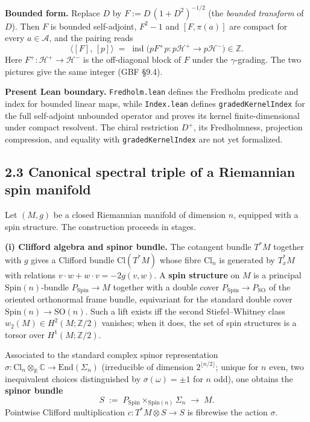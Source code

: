 \documentclass[
  11pt,
]{article}
\begin{document}
\textbf{Bounded form.} Replace \(D\) by \(F := D\,(1 + D^2)^{-1/2}\)
(the \emph{bounded transform} of \(D\)). Then \(F\) is bounded
self-adjoint, \(F^2 - 1\) and \([F, \pi(a)]\) are compact for every
\(a \in \mathcal{A}\), and the pairing reads \[
\bigl\langle [F],\,[p]\bigr\rangle
\;=\; \mathop{\mathrm{ind}}\bigl(p F^+ p\colon p\mathcal{H}^+ \to p\mathcal{H}^-\bigr) \in \mathbb{Z}.
\] Here \(F^+\colon \mathcal{H}^+ \to \mathcal{H}^-\) is the
off-diagonal block of \(F\) under the \(\gamma\)-grading. The two
pictures give the same integer (GBF §9.4).

\textbf{Present Lean boundary.} \texttt{Fredholm.lean} defines the
Fredholm predicate and index for bounded linear maps, while
\texttt{Index.lean} defines \texttt{gradedKernelIndex} for the full
self-adjoint unbounded operator and proves its kernel finite-dimensional
under compact resolvent. The chiral restriction \(D^+\), its Fredholmness,
projection compression, and equality with \texttt{gradedKernelIndex} are
not yet formalized.

\subsection{2.3 Canonical spectral triple of a Riemannian spin
manifold}\label{canonical-spectral-triple-of-a-riemannian-spin-manifold}

Let \((M, g)\) be a closed Riemannian manifold of dimension \(n\),
equipped with a spin structure. The construction proceeds in stages.

\textbf{(i) Clifford algebra and spinor bundle.} The cotangent bundle
\(T^*M\) together with \(g\) gives a Clifford bundle
\(\mathrm{Cl}(T^*M)\) whose fibre \(\mathrm{Cl}_n\) is generated by
\(T^*_x M\) with relations \(v \cdot w + w \cdot v = -2 g(v, w)\). A
\textbf{spin structure} on \(M\) is a principal
\(\mathrm{Spin}(n)\)-bundle \(P_{\mathrm{Spin}} \to M\) together with a
double cover \(P_{\mathrm{Spin}} \to P_{\mathrm{SO}}\) of the oriented
orthonormal frame bundle, equivariant for the standard double cover
\(\mathrm{Spin}(n) \to \mathrm{SO}(n)\). Such a lift exists iff the
second Stiefel--Whitney class \(w_2(M) \in H^2(M; \mathbb{Z}/2)\)
vanishes; when it does, the set of spin structures is a torsor over
\(H^1(M; \mathbb{Z}/2)\).

Associated to the standard complex spinor representation
\(\sigma\colon \mathrm{Cl}_n \otimes_{\mathbb{R}} \mathbb{C}\to \mathrm{End}(\Sigma_n)\)
(irreducible of dimension \(2^{\lfloor n/2 \rfloor}\); unique for \(n\)
even, two inequivalent choices distinguished by
\(\sigma(\omega) = \pm 1\) for \(n\) odd), one obtains the
\textbf{spinor bundle} \[
S \;:=\; P_{\mathrm{Spin}} \times_{\mathrm{Spin}(n)} \Sigma_n
\;\longrightarrow\; M.
\] Pointwise Clifford multiplication \(c\colon T^*M \otimes S \to S\) is
fibrewise the action \(\sigma\).
\end{document}
